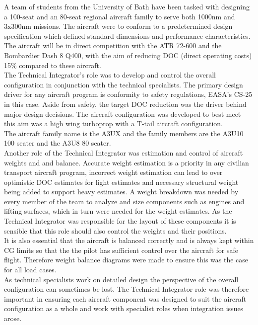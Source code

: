 \documentclass[11pt]{article}
\begin{document}
A team of students from the University of Bath have been tasked with designing a 100-seat and an 80-seat regional aircraft family to serve both 1000nm and 3x300nm missions. The aircraft were to conform to a predetermined design specification\cite{SPEC} which defined standard dimensions and performance characteristics. The aircraft will be in direct competition with the ATR 72-600 and the Bombardier Dash 8 Q400, with the aim of reducing DOC (direct operating costs) 15\% compared to these aircraft. \\
The Technical Integrator's role was to develop and control the overall configuration in conjunction with the technical specialists. The primary design driver for any aircraft program is conformity to safety regulations, EASA's CS-25 \cite{CS25} in this case. Aside from safety, the target DOC reduction was the driver behind major design decisions. The aircraft configuration was developed to best meet this aim was a high wing turboprop with a T-tail aircraft configuration.\\
The aircraft family name is the A3UX and the family members are the A3U10 100 seater and the A3U8 80 seater.
\\
Another role of the Technical Integrator was estimation and control of aircraft weights and and balance. Accurate weight estimation is a priority in any civilian transport aircraft program, incorrect weight estimation can lead to over optimistic DOC estimates for light estimates and necessary structural weight being added to support heavy estimates. A weight breakdown was needed by every member of the team to analyze and size components such as engines and lifting surfaces, which in turn were needed for the weight estimates. As the Technical Integrator was responsible for the layout of these components it is sensible that this role should also control the weights and their positions.\\It is also essential that the aircraft is balanced correctly and is always kept within CG limits so that the the pilot has sufficient control over the aircraft for safe flight. Therefore weight balance diagrams were made to ensure this was the case for all load cases.
\\
As technical specialists work on detailed design the perspective of the overall configuration can sometimes be lost. The Technical Integrator role was therefore important in ensuring each aircraft component was designed to suit the aircraft configuration as a whole and work with specialist roles when integration issues arose.\\
\end{document}
